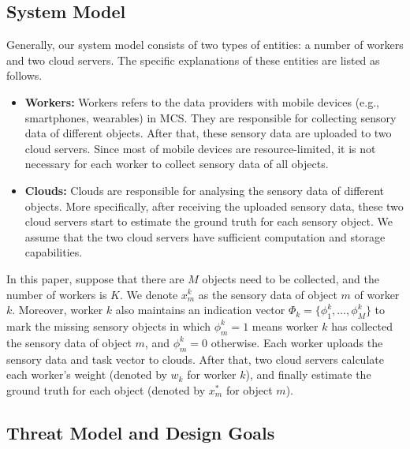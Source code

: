 \documentclass[conference]{IEEEtran}
\begin{document}
\subsection{System Model}\label{sec3-A}
Generally, our system model consists of two types of entities: a number of workers and two cloud servers. %
The specific explanations of these entities are listed as follows.
\begin{itemize}
  \item \textbf{Workers:} Workers refers to the data providers with mobile devices (e.g., smartphones, wearables) in MCS. They are responsible for collecting sensory data of different objects. After that, these sensory data are uploaded to two cloud servers.  Since most of mobile devices are resource-limited, it is not necessary for each worker to collect sensory data of all objects.
  \item \textbf{Clouds:} Clouds are responsible for analysing the sensory data of different objects. More specifically, after receiving the uploaded sensory data, these two cloud servers start to estimate the ground truth for each sensory object. We assume that the two cloud servers have sufficient computation and storage capabilities.
\end{itemize}
In this paper, suppose that there are $M$ objects need to be collected, and the number of workers is $K$.
We denote $x_m^k$ as the sensory data of object $m$ of worker $k$.
Moreover, worker $k$ also maintains an indication vector $\Phi_k = \{\phi_1^k, \ldots, \phi_M^k\}$ to mark the missing sensory objects in which $\phi_m^k = 1$ means worker $k$ has collected the sensory data of object $m$, and $\phi_m^k = 0$ otherwise.
Each worker uploads the sensory data and task vector to clouds.
After that, two cloud servers calculate each worker's weight (denoted by $w_k$ for worker $k$), and finally estimate the ground truth for each object (denoted by $x_m^*$ for object $m$). 
\subsection{Threat Model and Design Goals}
\end{document}
